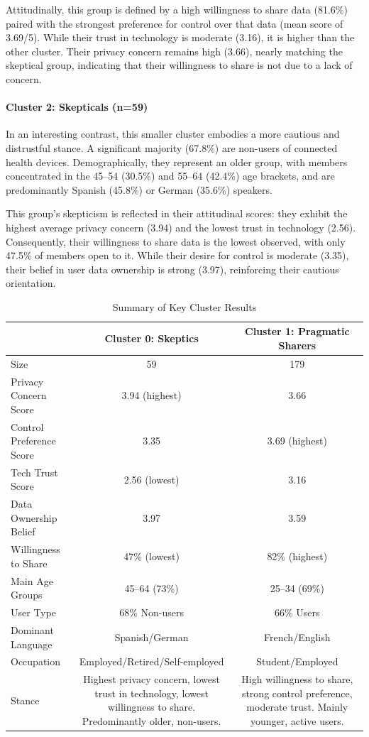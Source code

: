 Attitudinally, this group is defined by a high willingness to share data (81.6\%) paired with the strongest preference for control over that data (mean score of 3.69/5). While their trust in technology is moderate (3.16), it is higher than the other cluster. Their privacy concern remains high (3.66), nearly matching the skeptical group, indicating that their willingness to share is not due to a lack of concern.

\paragraph{Cluster 2: Skepticals (n=59)} In an interesting contrast, this smaller cluster embodies a more cautious and distrustful stance. A significant majority (67.8\%) are non-users of connected health devices. Demographically, they represent an older group, with members concentrated in the 45--54 (30.5\%) and 55--64 (42.4\%) age brackets, and are predominantly Spanish (45.8\%) or German (35.6\%) speakers.

This group’s skepticism is reflected in their attitudinal scores: they exhibit the highest average privacy concern (3.94) and the lowest trust in technology (2.56). Consequently, their willingness to share data is the lowest observed, with only 47.5\% of members open to it. While their desire for control is moderate (3.35), their belief in user data ownership is strong (3.97), reinforcing their cautious orientation.

\begin{table}[ht] 
	\caption{Summary of Key Cluster Results}
	\centering
	\begin{tabular}{lcc}
		\toprule
		& \textbf{Cluster 0: Skeptics} & \textbf{Cluster 1: Pragmatic Sharers} \\
		\midrule
		Size & 59 & 179 \\
		Privacy Concern Score & 3.94 (highest) & 3.66 \\
		Control Preference Score & 3.35 & 3.69 (highest) \\
		Tech Trust Score & 2.56 (lowest) & 3.16 \\
		Data Ownership Belief & 3.97 & 3.59 \\
		Willingness to Share & 47\% (lowest) & 82\% (highest) \\
		Main Age Groups & 45--64 (73\%) & 25--34 (69\%) \\
		User Type & 68\% Non-users & 66\% Users \\
		Dominant Language & Spanish/German & French/English \\
		Occupation & Employed/Retired/Self-employed & Student/Employed \\
		\midrule
		Stance & \parbox{6cm}{Highest privacy concern, lowest trust in technology, lowest willingness to share. Predominantly older, non-users.} & \parbox{6cm}{High willingness to share, strong control preference, moderate trust. Mainly younger, active users.} \\
		\bottomrule
	\end{tabular}
	\label{tab:cluster_summary_brief}
\end{table}

